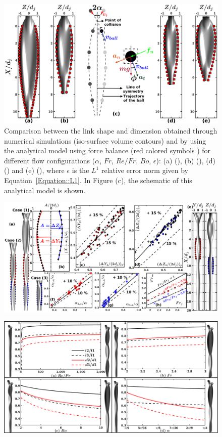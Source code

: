 \documentclass{jfm}
\begin{document}
\clearpage
\begin{figure}
	\centering
	\includegraphics[width=\linewidth]{Figure8}
	\caption{Comparison between the link shape and dimension obtained through numerical simulations (iso-surface volume contours) and by using the analytical model using force balance (red colored symbols \protect\MarkerSquareRed) for different flow configurations ($\alpha$, $Fr$, $Re/Fr$, $Bo$, $\epsilon$): (a) (), (b) (), (d) () and (e) (), where $\epsilon$ is the $L^1$ relative error norm given by Equation~\ref{Equation::L1}. In Figure (c), the schematic of this analytical model is shown.}
	\label{Figure::analytical}
\end{figure}
\clearpage
\begin{figure}
	\centering
	\includegraphics[width=\linewidth]{Figure9}
	\caption{}
	\label{Figure::secondCollision}
\end{figure}
\clearpage
\begin{figure}
	\centering
	\includegraphics[width=\linewidth]{Figure10}
	\caption{}
	\label{Figure::lil1}
\end{figure}
\clearpage


\end{document}

